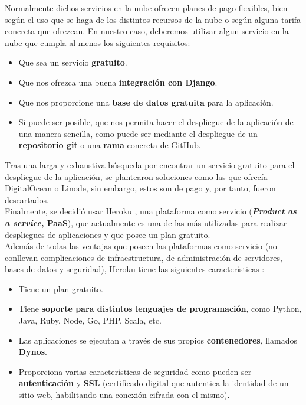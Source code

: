 Normalmente dichos servicios en la nube ofrecen planes de pago flexibles, bien según
el uso que se haga de los distintos recursos de la nube o según alguna tarifa concreta
que ofrezcan. En nuestro caso, deberemos utilizar algun servicio en la nube que cumpla
al menos los siguientes requisitos:

    \begin{itemize}
        \item Que sea un servicio \textbf{gratuito}.
        \item Que nos ofrezca una buena \textbf{integración con Django}.
        \item Que nos proporcione una \textbf{base de datos gratuita} para la aplicación.
        \item Si puede ser posible, que nos permita hacer el despliegue de la
        aplicación de una manera sencilla, como puede ser mediante el despliegue de un
        \textbf{repositorio git} o una \textbf{rama} concreta de GitHub. 
    \end{itemize}

Tras una larga y exhaustiva búsqueda por encontrar un servicio gratuito para el
despliegue de la aplicación, se plantearon soluciones como las que ofrecía
\href{https://docs.digitalocean.com/tutorials/app-deploy-django-app/}{DigitalOcean}
o \href{https://www.linode.com/docs/products/tools/marketplace/guides/django/}{Linode},
sin embargo, estos son de pago y, por tanto, fueron descartados.\\

Finalmente, se decidió usar Heroku \cite{heroku}, una plataforma como servicio
(\textbf{\textit{Product as a service}, PaaS}), que actualmente es una de las más
utilizadas para realizar despliegues de aplicaciones y que posee un plan gratuito.\\

Además de todas las ventajas que poseen las plataformas como servicio (no conllevan
complicaciones de infraestructura, de administración de servidores, bases de datos y
seguridad), Heroku tiene las siguientes características \cite{heroku-features}:

    \begin{itemize}
        \item Tiene un plan gratuito.
        \item Tiene \textbf{soporte para distintos lenguajes de programación}, como Python,
        Java, Ruby, Node, Go, PHP, Scala, etc.
        \item Las aplicaciones se ejecutan a través de sus propios \textbf{contenedores},
        llamados \textbf{Dynos}.
        \item Proporciona varias características de seguridad como pueden ser
        \textbf{autenticación} y \textbf{SSL} (certificado digital que autentica la
        identidad de un sitio web, habilitando una conexión cifrada con el mismo).
    \end{itemize}


